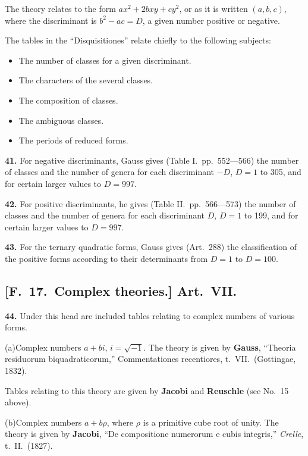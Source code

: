 \documentclass[11pt,a4paper]{article}
\begin{document}
The theory relates to the form $ax^{2} + 2bxy + cy^{2}$, or as it is written $(a, b, c)$,
where the discriminant is $b^{2} - ac = D$, a given number positive or negative.

The tables in the ``Disquisitiones'' relate chiefly to the following subjects:
\begin{itemize}
\item The number of classes for a given discriminant.
\item The characters of the several classes.
\item The composition of classes.
\item The ambiguous classes.
\item The periods of reduced forms.
\end{itemize}

\textbf{41.} For negative discriminants, Gauss gives (Table I.\ pp.\ 552---566) the number of
classes and the number of genera for each discriminant $-D$, $D = 1$ to 305, and for
certain larger values to $D = 997$.

\textbf{42.} For positive discriminants, he gives (Table II.\ pp.\ 566---573) the number of
classes and the number of genera for each discriminant $D$, $D = 1$ to 199, and for
certain larger values to $D = 997$.

\textbf{43.} For the ternary quadratic forms, Gauss gives (Art.\ 288) the classification of
the positive forms according to their determinants from $D = 1$ to $D = 100$.

\newpage
\subsection*{[F.\ 17.\ Complex theories.] Art.\ VII.}

\textbf{44.} Under this head are included tables relating to complex numbers of various forms.

\quad(a)\quad Complex numbers $a + bi$, $i = \sqrt{-1}$.
The theory is given by
\quad\textbf{Gauss}, ``Theoria residuorum biquadraticorum,'' Commentationes recentiores,
t.\ VII.\ (Gottingae, 1832).

Tables relating to this theory are given by
\quad\textbf{Jacobi} and \textbf{Reuschle} (see No.\ 15 above).

\quad(b)\quad Complex numbers $a + b\rho$, where $\rho$ is a primitive cube root of unity.
The theory is given by
\quad\textbf{Jacobi}, ``De compositione numerorum e cubis integris,'' \textit{Crelle}, t.\ II.\ (1827).
\end{document}
